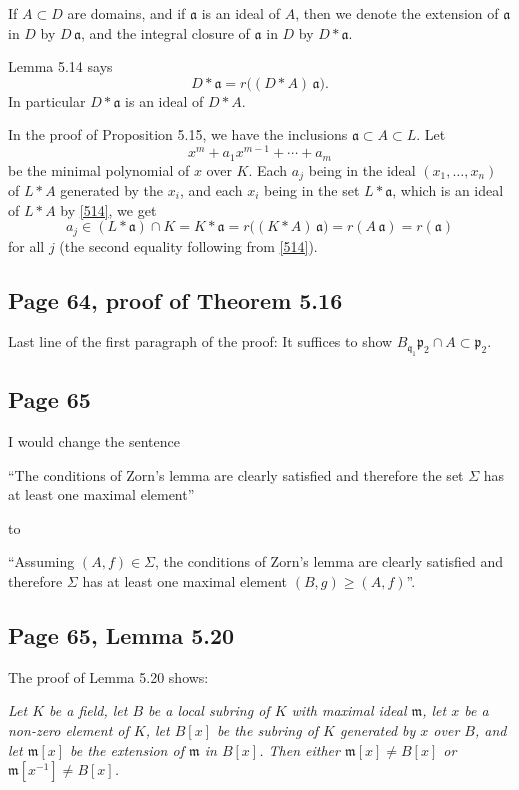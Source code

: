 \documentclass[parskip=half,fontsize=12pt]{scrartcl}%
\newcommand{\mf}{\mathfrak}
\newcommand{\aaa}{\mf a}
\newcommand{\mmm}{\mf m}
\newcommand{\ppp}{\mf p}
\newcommand{\qqq}{\mf q}
\begin{document}
If $A\subset D$ are domains, and if $\aaa$ is an ideal of $A$, then we denote the extension of $\aaa$ in $D$ by $D\,\aaa$, and the integral closure of $\aaa$ in $D$ by $D*\aaa$. 

Lemma 5.14 says
\begin{equation}\label{514}
D*\aaa=r\Big((D*A)\,\aaa\Big).
\end{equation}
In particular $D*\aaa$ is an ideal of $D*A$. 

In the proof of Proposition 5.15, we have the inclusions $\aaa\subset A\subset L$. Let 
$$
x^m+a_1x^{m-1}+\cdots+a_m
$$ 
be the minimal polynomial of $x$ over $K$. Each $a_j$ being in the ideal $(x_1,\dots,x_n)$ of $L*A$ generated by the $x_i$, and each $x_i$ being in the set $L*\aaa$, which is an ideal of $L*A$ by \eqref{514}, we get 
$$
a_j\in(L*\aaa)\cap K=K*\aaa=r\Big((K*A)\,\aaa\Big)=r(A\,\aaa)=r(\aaa)
$$ 
for all $j$ (the second equality following from \eqref{514}).

\subsection{Page 64, proof of Theorem 5.16}%

Last line of the first paragraph of the proof: It suffices to show $B_{\qqq_1}\ppp_2\cap A\subset\ppp_2$.

\subsection{Page 65}\label{65}%

I would change the sentence

``The conditions of Zorn's lemma are clearly satisfied and therefore the set $\Sigma$ has at least one maximal element''

to 

``Assuming $(A,f)\in\Sigma$, the conditions of Zorn's lemma are clearly satisfied and therefore $\Sigma$ has at least one maximal element $(B,g)\ge(A,f)$''. %

\subsection{Page 65, Lemma 5.20}\label{520}%

The proof of Lemma 5.20 shows:

\emph{Let $K$ be a field, let $B$ be a local subring of $K$ with maximal ideal $\mmm$, let $x$ be a non-zero element of $K$, let $B[x]$ be the subring of $K$ generated by $x$ over $B$, and let $\mmm[x]$ be the extension of $\mmm$ in $B[x]$. Then either $\mmm[x]\ne B[x]$ or $\mmm[x^{-1}]\ne B[x]$.}
\end{document}
